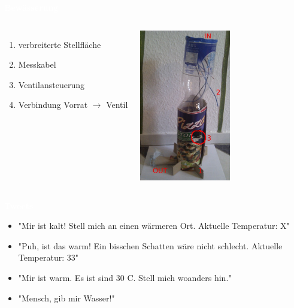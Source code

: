 \documentclass[bigger]{beamer}
\newcommand{\topic}[1]{{\huge{\textcolor{white}{\textbf{#1}}}}}
\begin{document}
\begin{frame}{\topic{Bewässerung}}
    \begin{columns}
        \begin{enumerate}
			\item verbreiterte Stellfläche
			\item Messkabel
			\item Ventilansteuerung
			\item Verbindung Vorrat $\rightarrow$ Ventil
        \end{enumerate}
        \includegraphics[width=150px]{System.jpg}
    \end{columns}
\end{frame} 

\begin{frame}{\topic{Tweets}}
	\begin{itemize}
      \item "Mir ist kalt! Stell mich an einen wärmeren Ort. Aktuelle Temperatur: X"
      \item "Puh, ist das warm! Ein bisschen Schatten wäre nicht schlecht. Aktuelle Temperatur: 33"
      \item "Mir ist warm. Es ist sind 30 C. Stell mich woanders hin."
      \item "Mensch, gib mir Wasser!"
	\end{itemize}
\end{frame}
\end{document}
